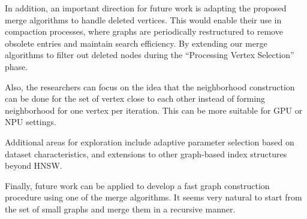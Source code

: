 \documentclass{article}
\begin{document}
In addition, an important direction for future work is adapting the proposed merge algorithms to handle deleted vertices. This would enable their use in compaction processes, where graphs are periodically restructured to remove obsolete entries and maintain search efficiency. By extending our merge algorithms to filter out deleted nodes during the ``Processing Vertex Selection'' phase.

Also, the researchers can focus on the idea that the neighborhood construction can be done for the set of vertex close to each other instead of forming neighborhood for one vertex per iteration. This can be more suitable for GPU or NPU settings.  

Additional areas for exploration include adaptive parameter selection based on dataset characteristics, and extensions to other graph-based index structures beyond HNSW. 

Finally, future work can be applied to develop a fast graph construction procedure using one of the merge algorithms. It seems very natural to start from the set of small graphs and merge them in a recursive manner.

\printbibliography
\end{document}
